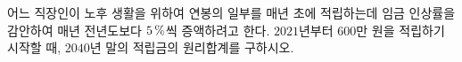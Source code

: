 어느 직장인이 노후 생활을 위하여 연봉의 일부를 매년 초에 적립하는데 임금 인상률을 감안하여 매년 전년도보다 $5\mkern3mu \%$씩 증액하려고 한다. $2021$년부터 $600$만 원을 적립하기 시작할 때, $2040$년 말의 적립금의 원리합계를 구하시오. 
